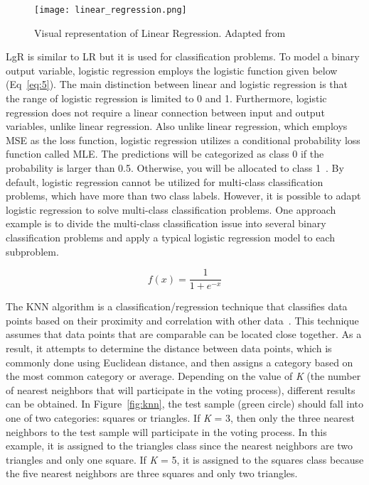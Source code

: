 \begin{figure}[htbp]
    \centering
    \texttt{[image: linear\_regression.png]}
    \caption{Visual representation of Linear Regression. Adapted from~\cite{Nasteski2017AnMethods}}
    \label{fig:linear_regression}
\end{figure}

\gls{LgR} is similar to \gls{LR} but it is used for classification problems. To model a binary output variable, logistic regression employs the logistic function given below (Eq~\ref{eq:5}). The main distinction between linear and logistic regression is that the range of logistic regression is limited to 0 and 1. Furthermore, logistic regression does not require a linear connection between input and output variables, unlike linear regression. Also unlike linear regression, which employs \gls{MSE} as the loss function, logistic regression utilizes a conditional probability loss function called \gls{MLE}. The predictions will be categorized as class 0 if the probability is larger than 0.5. Otherwise, you will be allocated to class 1~\cite{Belyadi2021SupervisedLearning}. By default, logistic regression cannot be utilized for multi-class classification problems, which have more than two class labels. However, it is possible to adapt logistic regression to solve  multi-class classification problems. One approach example is to divide the multi-class classification issue into several binary classification problems and apply a typical logistic regression model to each subproblem. 

\begin{equation}\label{eq:5}
    f(x) = \frac{1}{1+e^{-x}}
\end{equation}


The \gls{KNN} algorithm is a classification/regression technique that classifies data points based on their proximity and correlation with other data~\cite{2020WhatIBM}. This technique assumes that data points that are comparable can be located close together. As a result, it attempts to determine the distance between data points, which is commonly done using Euclidean distance, and then assigns a category based on the most common category or average. Depending on the value of \textit{K} (the number of nearest neighbors that will participate in the voting process), different results can be obtained. In Figure~\ref{fig:knn}, the test sample (green circle) should fall into one of two categories: squares or triangles. If \textit{K} = 3, then only the three nearest neighbors to the test sample will participate in the voting process. In this example, it is assigned to the triangles class since the nearest neighbors are two triangles and only one square. If \textit{K} = 5, it is assigned to the squares class because the five nearest neighbors are three squares and only two triangles.

